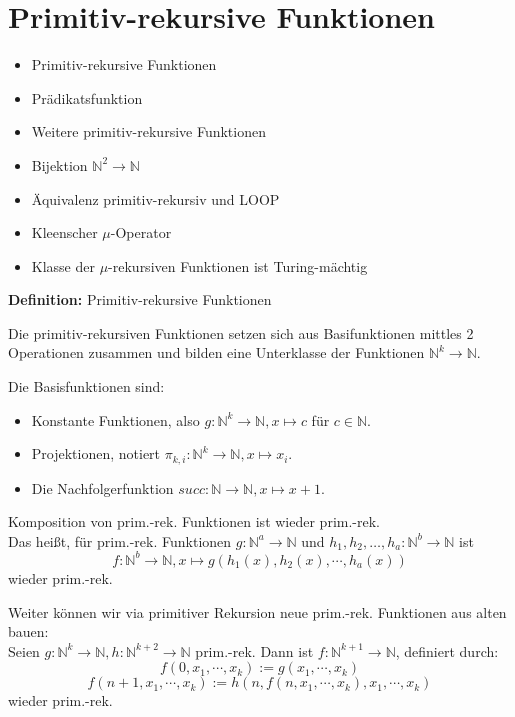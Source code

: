 \documentclass[a4paper,graphics,11pt]{article}
\begin{document}
\section{Primitiv-rekursive Funktionen}


\begin{itemize}
    \item Primitiv-rekursive Funktionen
    \item Prädikatsfunktion
    \item Weitere primitiv-rekursive Funktionen
    \item Bijektion $\mathbb{N}^2 \to \mathbb{N}$
    \item Äquivalenz primitiv-rekursiv und LOOP
    \item Kleenscher $\mu$-Operator
    \item Klasse der $\mu$-rekursiven Funktionen ist Turing-mächtig
\end{itemize}

\textbf{Definition:} Primitiv-rekursive Funktionen

Die primitiv-rekursiven Funktionen setzen sich aus Basifunktionen mittles 2 Operationen
zusammen und bilden eine Unterklasse der Funktionen $\mathbb{N}^k \to \mathbb{N}$.

Die Basisfunktionen sind:
\begin{itemize}
    \item Konstante Funktionen, also $g: \mathbb{N}^k \to \mathbb{N}, x \mapsto c$ für $c \in \mathbb{N}$.
    \item Projektionen, notiert $\pi_{k,i}: \mathbb{N}^k \to \mathbb{N}, x \mapsto x_i$.
    \item Die Nachfolgerfunktion $succ : \mathbb{N} \to \mathbb{N}, x \mapsto x+1$.
\end{itemize}
Komposition von prim.-rek. Funktionen ist wieder prim.-rek.\\
Das heißt, für prim.-rek. Funktionen
$g : \mathbb{N}^a \to \mathbb{N}$ und $h_1,h_2,\dots,h_a : \mathbb{N}^b \to \mathbb{N}$ ist
$$
    f: \mathbb{N}^b \to \mathbb{N}, x \mapsto g(h_1(x), h_2(x), \cdots, h_a(x))
$$
wieder prim.-rek.

Weiter können wir via primitiver Rekursion neue prim.-rek. Funktionen aus alten bauen:\\
Seien $g: \mathbb{N}^k \to \mathbb{N}, h: \mathbb{N}^{k+2} \to \mathbb{N}$ prim.-rek.
Dann ist $f: \mathbb{N}^{k+1} \to \mathbb{N}$, definiert durch:
$$
    f(0,x_1,\cdots,x_k) := g(x_1,\cdots,x_k)
$$$$
    f(n+1,x_1,\cdots,x_k) := h(n, f(n,x_1,\cdots,x_k), x_1,\cdots,x_k)
$$
wieder prim.-rek.
\end{document}
